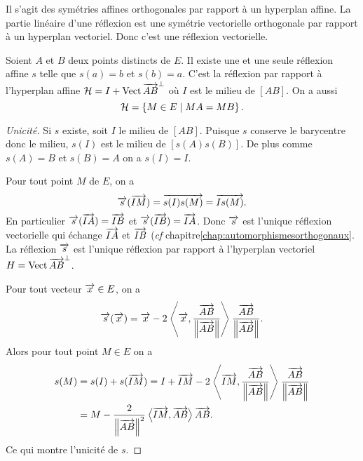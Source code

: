 Il s'agit des symétries affines orthogonales par rapport à un hyperplan affine. 
La partie linéaire d'une réflexion est une symétrie vectorielle orthogonale par 
rapport à un hyperplan vectoriel. Donc c'est une réflexion vectorielle.

\begin{prop}
  Soient \(A\) et \(B\) deux points distincts de \(E\). Il existe une et une 
  seule réflexion affine \(s\) telle que \(s(a)=b\) et \(s(b)=a\). C'est la 
  réflexion par rapport à l'hyperplan affine \(\mathcal{H}=I 
  +\operatorname{Vect}{\overrightarrow{AB}}^\perp\) où \(I\) est le milieu de \([AB]\). On a 
  aussi
  \begin{equation}
    \mathcal{H} = \left\{M \in E\mathrel{}\middle|\mathrel{}MA=MB\right\}.
  \end{equation}
\end{prop}
\begin{proof}[Unicité]
  Si \(s\) existe, soit \(I\) le milieu de \([AB]\). Puisque \(s\) conserve le 
  barycentre donc le milieu, \(s(I)\) est le milieu de \([s(A)s(B)]\). De plus 
  comme \(s(A)=B\) et \(s(B)=A\) on a \(s(I)=I\). 

  Pour tout point \(M\) de \(E\), on a
  \begin{equation}
    \overrightarrow{s}(\overrightarrow{IM}) = \overrightarrow{s(I)s(M)} = \overrightarrow{Is(M)}.
  \end{equation}
  En particulier \(\overrightarrow{s}(\overrightarrow{IA})=\overrightarrow{IB}\) et 
  \(\overrightarrow{s}(\overrightarrow{IB})=\overrightarrow{IA}\). Donc \(\overrightarrow{s}\) est l'unique réflexion 
  vectorielle qui échange \(\overrightarrow{IA}\) et \(\overrightarrow{IB}\) (\emph{cf} chapitre\ref{chap:automorphismesorthogonaux}. La réflexion \(\overrightarrow{s}\) est l'unique 
  réflexion par rapport à l'hyperplan vectoriel \(H = 
  \operatorname{Vect}{\overrightarrow{AB}}^\perp\).

  Pour tout vecteur \(\overrightarrow{x} \in E\), on a
  \begin{equation}
    \overrightarrow{s}(\overrightarrow{x}) = \overrightarrow{x} - 2\left\langle{\overrightarrow{x}},{\frac{\overrightarrow{AB}}{\left\lVert\overrightarrow{AB}\right\rVert}}\right\rangle 
    \frac{\overrightarrow{AB}}{\left\lVert\overrightarrow{AB}\right\rVert}.
  \end{equation}
  Alors pour tout point \(M \in E\) on a
  \begin{align*}
    s(M) &= s(I) + s(\overrightarrow{IM}) = I + \overrightarrow{IM} 
    -2\left\langle{\overrightarrow{IM}},{\frac{\overrightarrow{AB}}{\left\lVert\overrightarrow{AB}\right\rVert}}\right\rangle 
    \frac{\overrightarrow{AB}}{\left\lVert\overrightarrow{AB}\right\rVert} \\
    &=M -\frac{2}{\left\lVert\overrightarrow{AB}\right\rVert^2}\left\langle{\overrightarrow{IM}},{\overrightarrow{AB}}\right\rangle \overrightarrow{AB}.
  \end{align*}
  Ce qui montre l'unicité de \(s\).
\end{proof}
